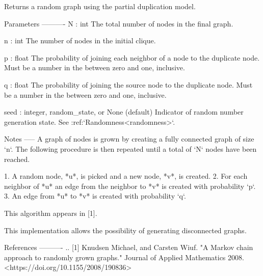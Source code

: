 \begin{DoxyVerb}Returns a random graph using the partial duplication model.

Parameters
----------
N : int
    The total number of nodes in the final graph.

n : int
    The number of nodes in the initial clique.

p : float
    The probability of joining each neighbor of a node to the
    duplicate node. Must be a number in the between zero and one,
    inclusive.

q : float
    The probability of joining the source node to the duplicate
    node. Must be a number in the between zero and one, inclusive.

seed : integer, random_state, or None (default)
    Indicator of random number generation state.
    See :ref:`Randomness<randomness>`.

Notes
-----
A graph of nodes is grown by creating a fully connected graph
of size `n`. The following procedure is then repeated until
a total of `N` nodes have been reached.

1. A random node, *u*, is picked and a new node, *v*, is created.
2. For each neighbor of *u* an edge from the neighbor to *v* is created
   with probability `p`.
3. An edge from *u* to *v* is created with probability `q`.

This algorithm appears in [1].

This implementation allows the possibility of generating
disconnected graphs.

References
----------
.. [1] Knudsen Michael, and Carsten Wiuf. "A Markov chain approach to
       randomly grown graphs." Journal of Applied Mathematics 2008.
       <https://doi.org/10.1155/2008/190836>\end{DoxyVerb}
 